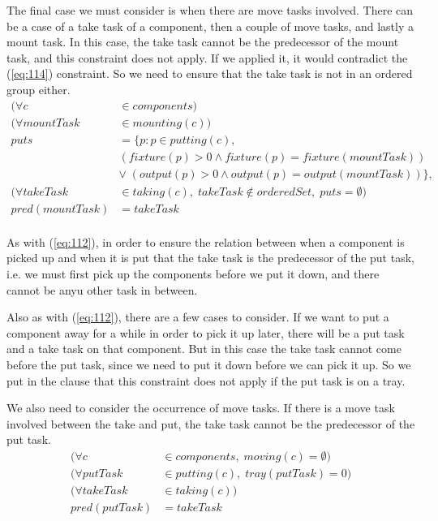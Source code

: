  The final case we must consider is when there are move tasks involved. There can be a case of a take task of a component, then a couple of move tasks, and lastly a mount task. In this case, the take task cannot be the predecessor of the mount task, and this constraint does not apply. If we applied it, it would contradict the (\ref{eq:114}) constraint. So we need to ensure that the take task is not in an ordered group either.
 \begin{equation}
 \begin{aligned}\label{eq:112}
 (\forall c &\in components) \\
 (\forall mountTask &\in mounting(c)) \\
 puts &= \{p : p \in putting(c),\\
 &(fixture(p) > 0 \land fixture(p) = fixture(mountTask)) \\
 &\lor \; (output(p) > 0 \land output(p) = output(mountTask))\}, \\
 (\forall takeTask &\in taking(c), \; takeTask \notin orderedSet, \; puts = \emptyset) \\
 pred(mountTask) &= takeTask \\
 \end{aligned}
 \end{equation}

  \noindent As with (\ref{eq:112}), in order to ensure the relation between when a component is picked up and when it is put that the take task is the predecessor of the put task, i.e. we must first pick up the components before we put it down, and there cannot be anyu other task in between.
  
  Also as with (\ref{eq:112}), there are a few cases to consider. If we want to put a component away for a while in order to pick it up later, there will be a put task and a take task on that component. But in this case the take task cannot come before the put task, since we need to put it down before we can pick it up. So we put in the clause that this constraint does not apply if the put task is on a tray.
  
  We also need to consider the occurrence of move tasks. If there is a move task involved between the take and put, the take task cannot be the predecessor of the put task.
 \begin{equation}
 \begin{aligned}\label{eq:113}
 (\forall c &\in components, \; moving(c) = \emptyset)\\
 (\forall putTask &\in putting(c), \; tray(putTask) = 0)\\
 (\forall takeTask &\in taking(c))\\
 pred(putTask) &= takeTask
 \end{aligned}
 \end{equation}

